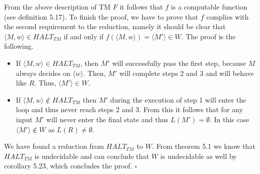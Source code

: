 \documentclass[a4paper, notitlepage]{article}
\begin{document}
From the above description of TM $F$ it follows that $f$ is a computable function (see definition 5.17). To finish the proof, we have to prove that $f$ complies with the second requirement to the reduction, namely it should be clear that $\langle M,w \rangle \in HALT_{TM}$ if and only if $f(\langle M,w \rangle) = \langle M' \rangle \in W$. The proof is the following.

\begin{itemize}
	\item If $\langle M, w \rangle \in HALT_{TM}$, then $M'$ will successfully pass the first step, because $M$ always decides on $\langle w \rangle$. Then, $M'$ will complete steps 2 and 3 and will behave like $R$. Thus, $\langle M' \rangle \in W$.
	\item If $\langle M, w \rangle \notin HALT_{TM}$ then $M'$ during the execution of step 1 will enter the loop and thus never reach steps 2 and 3. From this it follows that for any input $M'$ will never enter the final state and thus $L(M') = \emptyset$. In this case $\langle M' \rangle \notin W$ as $L(R) \neq \emptyset$.
\end{itemize}

We have found a reduction from $HALT_{TM}$ to $W$. From theorem 5.1 we know that $HALT_{TM}$ is undecidable and can conclude that $W$ is undecidable as well by corollary 5.23, which concludes the proof. $\square$
\end{document}
